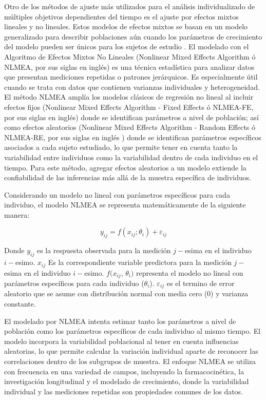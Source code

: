 Otro de los métodos de ajuste más utilizados para el análisis individualizado de múltiples objetivos dependientes del tiempo es el ajuste por efectos mixtos lineales y no lineales. Estos modelos de efectos mixtos se basan en un modelo generalizado para describir poblaciones aún cuando los parámetros de crecimiento del modelo pueden ser únicos para los sujetos de estudio \cite{mixedShelley}. El modelado con el Algoritmo de Efectos Mixtos No Lineales (Nonlinear Mixed Effects Algorithm ó NLMEA, por sus siglas en inglés) es una técnica estadística para analizar datos que presentan mediciones repetidas o patrones jerárquicos. Es especialmente útil cuando se trata con datos que contienen varianzas individuales y heterogeneidad. El método NLMEA amplía los modelos clásicos de regresión no lineal al incluir efectos fijos (Nonlinear Mixed Effects Algorithm - Fixed Effects ó NLMEA-FE, por sus siglas en inglés) donde se identifican parámetros a nivel de población; así como efectos aleatorios (Nonlinear Mixed Effects Algorithm - Random Effects ó NLMEA-RE, por sus siglas en inglés ) donde se identifican parámetros específicos asociados a cada sujeto estudiado, lo que permite tener en cuenta tanto la variabilidad entre individuos como la variabilidad dentro de cada individuo en el tiempo. Para este método, agregar efectos aleatorios a un modelo extiende la confiabilidad de las inferencias más allá de la muestra específica de individuos.

Considerando un modelo no lineal con parámetros específicos para cada individuo, el modelo NLMEA se representa matemáticamente de la siguiente manera:

\begin{equation}
y_{ij} = f(x_{ij}; \theta_i) + \varepsilon_{ij}
\end{equation}

Donde $y_{ij}$ es la respuesta observada para la medición  $j-$esima en el individuo $i-$esimo. $x_{ij}$ Es la correspondiente variable predictora para la medición $j-$esima en el individuo $i-$esimo. $f(x_{ij}$, $\theta_{i})$ representa el modelo no lineal con parámetros específicos para cada individuo ($\theta_{i}$). $\varepsilon_{ij} $ es el termino de error aleatorio que se asume con distribución normal con media cero (0) y varianza constante.


El modelado por NLMEA intenta estimar tanto los parámetros a nivel de población como los parámetros específicos de cada individuo al mismo tiempo. El modelo incorpora la variabilidad poblacional al tener en cuenta influencias aleatorias, lo que permite calcular la variación individual aparte de reconocer las correlaciones dentro de los subgrupos de muestra. El enfoque NLMEA se utiliza con frecuencia en una variedad de campos, incluyendo la farmacocinética, la investigación longitudinal y el modelado de crecimiento, donde la variabilidad individual y las mediciones repetidas son propiedades comunes de los datos.


